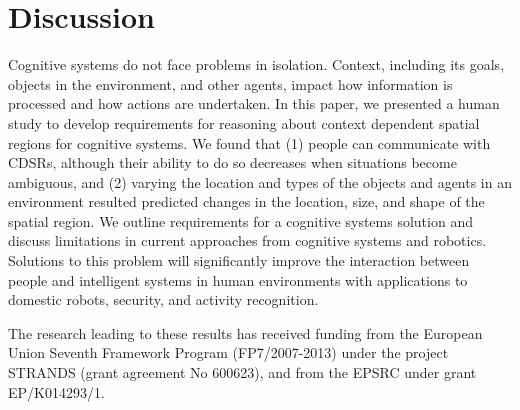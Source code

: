 \documentclass[11pt,letterpaper]{article}
\begin{document}




\section{Discussion}
Cognitive systems do not face problems in isolation.  Context, including its goals, objects in the environment, and other agents, impact how information is processed and how actions are undertaken.  In this paper, we presented a human study to develop requirements for reasoning about context dependent spatial regions for cognitive systems.  We found that (1) people can communicate with CDSRs, although their ability to do so decreases when situations become ambiguous, and (2) varying the location and types of the objects and agents in an environment resulted predicted changes in the location, size, and shape of the spatial region.  We outline requirements for a cognitive systems solution and discuss limitations in current approaches from cognitive systems and robotics.  Solutions to this problem will significantly improve the interaction between people and intelligent systems in human environments with applications to domestic robots, security, and activity recognition.

\begin{acknowledgements} 
\noindent
The research leading to these results has received funding from the European Union Seventh Framework Program (FP7/2007-2013) under the project STRANDS (grant agreement No 600623), and from the EPSRC under grant EP/K014293/1.
\end{acknowledgements} 




\vspace{-0.25in}

{\parindent -10pt\leftskip 10pt\noindent
\footnotesize



}

\end{document}
